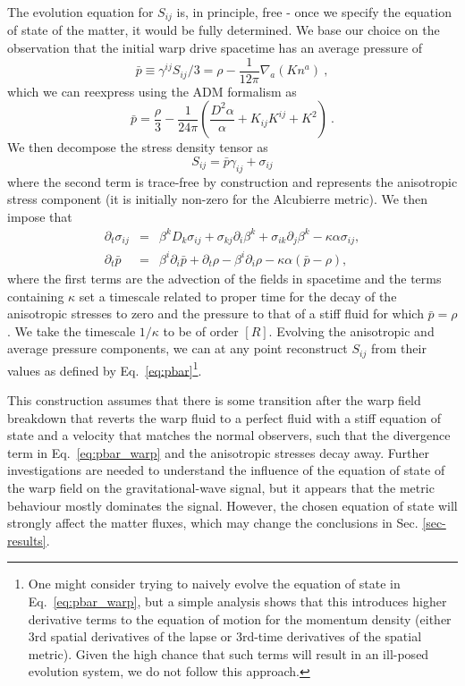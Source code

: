 \documentclass[twocolumn, numberedappendix, twocolappendix,apj, iop, a4paper]{openjournal}
\begin{document}
The evolution equation for $S_{ij}$ is, in principle, free - once we specify the equation of state of the matter, it would be fully determined. We base our choice on the observation that the initial warp drive spacetime has an average pressure of \citep{Santiago:2021aup}
\begin{equation}
\bar{p} \equiv \gamma^{ij} S_{ij} /3 = \rho - \frac{1}{12\pi} \nabla_a(K n^a) ~, \label{eq:pbar_warp}
\end{equation} 
which we can reexpress using the ADM formalism as
\begin{equation}
\bar{p} = \frac{\rho}{3} - \frac{1}{24\pi} \left( \frac{D^2\alpha}{\alpha} + K_{ij} K^{ij} + K^2 \right) ~.
\end{equation} 
We then decompose the stress density tensor as
\begin{equation}
    S_{ij} = \bar{p} \gamma_{ij} + \sigma_{ij}
    \label{eq:pbar}
\end{equation}
where the second term is trace-free by construction and represents the anisotropic stress component (it is initially non-zero for the Alcubierre metric). We then impose that
\begin{eqnarray}
\partial_t \sigma_{ij} &=&  
    \beta^k D_k \sigma_{ij} + \sigma_{kj} \partial_i \beta^k + \sigma_{ik} \partial_j \beta^k - \kappa \alpha \sigma_{ij}, \\
    \partial_t \bar{p} &=&  
    \beta^i \partial_i \bar{p}
    + \partial_t {\rho}
    - \beta^i \partial_i \rho
    - \kappa \alpha (\bar{p} - \rho),
\end{eqnarray}
where the first terms are the advection of the fields in spacetime and the terms containing $\kappa$ set a timescale related to proper time for the decay of the anisotropic stresses to zero and the pressure to that of a stiff fluid for which $\bar{p} = \rho$. We take the timescale $1/\kappa$ to be of order $[R]$. Evolving the anisotropic and average pressure components, we can at any point reconstruct $S_{ij}$ from their values as defined by Eq.~\eqref{eq:pbar}\footnote{One might consider trying to naively evolve the equation of state in Eq.~\eqref{eq:pbar_warp}, but a simple analysis shows that this introduces higher derivative terms to the equation of motion for the momentum density (either 3rd spatial derivatives of the lapse or 3rd-time derivatives of the spatial metric). Given the high chance that such terms will result in an ill-posed evolution system, we do not follow this approach.}.

This construction assumes that there is some transition after the warp field breakdown that reverts the warp fluid to a perfect fluid with a stiff equation of state and a velocity that matches the normal observers, such that the divergence term in Eq.~\eqref{eq:pbar_warp} and the anisotropic stresses decay away. Further investigations are needed to understand the influence of the equation of state of the warp field on the gravitational-wave signal, but it appears that the metric behaviour mostly dominates the signal. However, the chosen equation of state will strongly affect the matter fluxes, which may change the conclusions in Sec. \ref{sec-results}.
\end{document}
